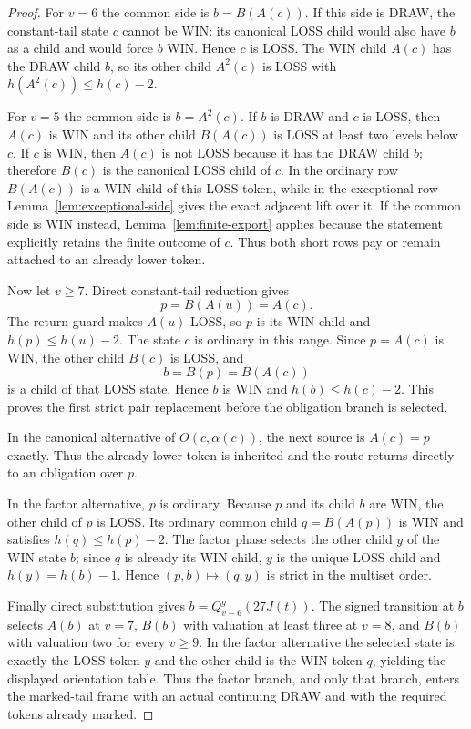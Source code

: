 \documentclass[11pt]{article}
\begin{document}
\begin{proof}
For $v=6$ the common side is $b=B(A(c))$. If this side is DRAW, the
constant-tail state $c$ cannot be WIN: its canonical LOSS child would also
have $b$ as a child and would force $b$ WIN. Hence $c$ is LOSS. The WIN child
$A(c)$ has the DRAW child $b$, so its other child $A^2(c)$ is LOSS with
$h(A^2(c))\le h(c)-2$.

For $v=5$ the common side is $b=A^2(c)$. If $b$ is DRAW and $c$ is LOSS,
then $A(c)$ is WIN and its other child $B(A(c))$ is LOSS at least two levels
below $c$. If $c$ is WIN, then $A(c)$ is not LOSS because it has the DRAW
child $b$; therefore $B(c)$ is the canonical LOSS child of $c$. In the
ordinary row $B(A(c))$ is a WIN child of this LOSS token, while in the
exceptional row Lemma~\ref{lem:exceptional-side} gives the exact adjacent
lift over it. If the common side is WIN instead, Lemma~\ref{lem:finite-export}
applies because the statement explicitly retains the finite outcome of $c$.
Thus both short rows pay or remain attached to an already lower token.

Now let $v\ge7$. Direct constant-tail reduction gives
\[
 p=B(A(u))=A(c).
\]
The return guard makes $A(u)$ LOSS, so $p$ is its WIN child and
$h(p)\le h(u)-2$. The state $c$ is ordinary in this range. Since $p=A(c)$
is WIN, the other child $B(c)$ is LOSS, and
\[
 b=B(p)=B(A(c))
\]
is a child of that LOSS state. Hence $b$ is WIN and
$h(b)\le h(c)-2$. This proves the first strict pair replacement before the
obligation branch is selected.

In the canonical alternative of $O(c,\alpha(c))$, the next source is
$A(c)=p$ exactly. Thus the already lower token is inherited and the route
returns directly to an obligation over $p$.

In the factor alternative, $p$ is ordinary. Because $p$ and its child $b$
are WIN, the other child of $p$ is LOSS. Its ordinary common child
$q=B(A(p))$ is WIN and satisfies $h(q)\le h(p)-2$. The factor phase selects
the other child $y$ of the WIN state $b$; since $q$ is already its WIN child,
$y$ is the unique LOSS child and $h(y)=h(b)-1$. Hence
$(p,b)\mapsto(q,y)$ is strict in the multiset order.

Finally direct substitution gives $b=Q_{v-6}^g(27J(t))$. The signed
transition at $b$ selects $A(b)$ at $v=7$, $B(b)$ with valuation at least
three at $v=8$, and $B(b)$ with valuation two for every $v\ge9$. In the
factor alternative the selected state is exactly the LOSS token $y$ and the
other child is the WIN token $q$, yielding the displayed orientation table.
Thus the factor branch, and only that branch, enters the marked-tail frame
with an actual continuing DRAW and with the required tokens already marked.
\end{proof}
\end{document}
